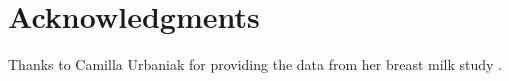 \documentclass[10pt,letterpaper]{article}
\begin{document}
\section*{Acknowledgments}
Thanks to Camilla Urbaniak for providing the data from her breast milk study \cite{urbaniak2016human}.

\nolinenumbers

%
%
% 

\end{document}
